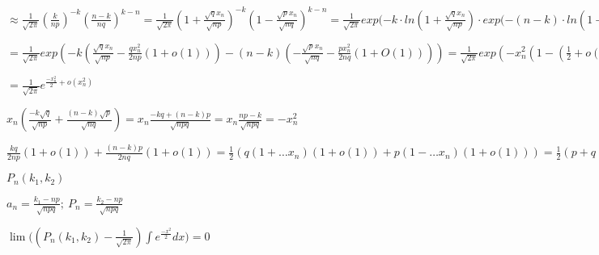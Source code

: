 \documentclass[14pt, letter paper]{article}
\begin{document}
$\approx \frac{1}{\sqrt{2\pi}} (\frac{k}{np})^{-k}(\frac{n-k}{nq})^{k-n} = \frac{1}{\sqrt{2\pi}} (1 + \frac{\sqrt{q}x_n}{\sqrt{np}})^{-k}(1 - \frac{\sqrt{p}x_n}{\sqrt{nq}})^{k-n} = \frac{1}{\sqrt{2\pi}} exp(-k \cdot ln(1 + \frac{\sqrt{q}x_n}{\sqrt{np}}) \cdot exp(-(n-k) \cdot ln(1 - \frac{\sqrt{p}x_n}{\sqrt{nq}}) =$

$= \frac{1}{\sqrt{2\pi}} exp(-k(\frac{\sqrt{q}x_n}{\sqrt{np}} - \frac{qx^2_n}{2np}(1 + o(1))) - (n-k)( - \frac{\sqrt{p}x_n}{\sqrt{nq}} - \frac{px^2_n}{2nq}(1 + O(1)))) = \frac{1}{\sqrt{2\pi}}exp(-x_n^2(1 - (\frac{1}{2} + o(1)))) =$

$= \frac{1}{\sqrt{2\pi}}e^{\frac{-x_n^2}{2} + o(x_n^2)}$

\vspace{3mm}

$x_n(\frac{-k\sqrt{q}}{\sqrt{np}} + \frac{(n-k)\sqrt{p}}{\sqrt{nq}}) = x_n \frac{-kq + (n-k)p}{\sqrt{npq}} = x_n \frac{np -k}{\sqrt{npq}} = -x_n^2$

\vspace{3mm}

$\frac{kq}{2np}(1 + o(1)) + \frac{(n - k)p}{2nq}(1 + o(1)) = \frac{1}{2}(q(1 + \ldots x_n)(1 + o(1)) + p(1 - \ldots x_n)(1 + o(1))) = \frac{1}{2}(p + q)(1 + o(1))$

\vspace{5mm}

$P_n(k_1, k_2)$

$a_n = \frac{k_1-np}{\sqrt{npq}};\ P_n = \frac{k_2 - np}{\sqrt{npq}}$

$\lim{((P_n(k_1, k_2) - \frac{1}{\sqrt{2\pi}})\int e^{\frac{-x^2}{2}}} dx) = 0$
\end{document}

